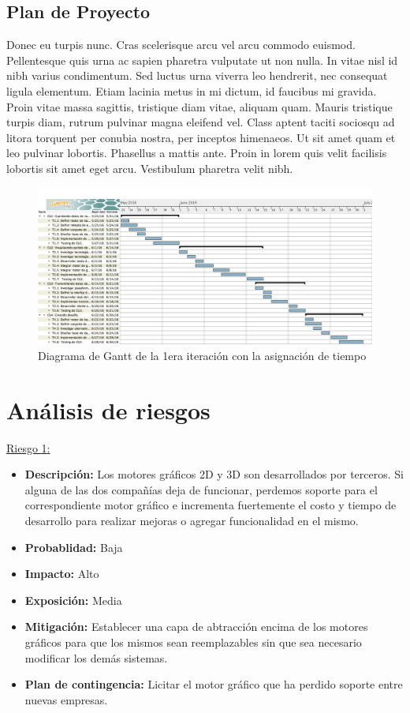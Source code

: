 \documentclass[a4paper, 10pt, twoside]{article}
\newcommand{\riesgo}[7]{
  \underline{Riesgo {#1}:}
  \begin{itemize}   
    \item \textbf{Descripción:} {#2}
    \item \textbf{Probablidad:} {#3}
    \item \textbf{Impacto:} {#4}
    \item \textbf{Exposición:} {#5}
    \item \textbf{Mitigación:} {#6}
    \item \textbf{Plan de contingencia:} {#7}
  \end{itemize}
}
\begin{document}
\subsection{Plan de Proyecto}
Donec eu turpis nunc. Cras scelerisque arcu vel arcu commodo euismod. Pellentesque quis urna ac sapien pharetra vulputate ut non nulla. In vitae nisl id nibh varius condimentum. Sed luctus urna viverra leo hendrerit, nec consequat ligula elementum. Etiam lacinia metus in mi dictum, id faucibus mi gravida. Proin vitae massa sagittis, tristique diam vitae, aliquam quam. Mauris tristique turpis diam, rutrum pulvinar magna eleifend vel. Class aptent taciti sociosqu ad litora torquent per conubia nostra, per inceptos himenaeos. Ut sit amet quam et leo pulvinar lobortis. Phasellus a mattis ante. Proin in lorem quis velit facilisis lobortis sit amet eget arcu. Vestibulum pharetra velit nibh.

\begin{landscape}
\begin{center}
  \begin{figure}[h!]
    \includegraphics[width=25cm]{gantt.png}
    \caption{Diagrama de Gantt de la 1era iteración con la asignación de tiempo}
    \label{fig:gantt}
  \end{figure}
\end{center}
\end{landscape}
\newpage


\section{Análisis de riesgos}
\label{riesgos:r1}
\riesgo{1}
    { Los motores gráficos 2D y 3D son desarrollados por terceros. Si alguna de las dos compañías deja de funcionar, perdemos soporte para el correspondiente motor gráfico e incrementa fuertemente el costo y tiempo de desarrollo para realizar mejoras o agregar funcionalidad en el mismo. }
    {Baja} %
    {Alto} %
    {Media} %
    {Establecer una capa de abtracción encima de los motores gráficos para que los mismos sean reemplazables sin que sea necesario modificar los demás sistemas.} %
    {Licitar el motor gráfico que ha perdido soporte entre nuevas empresas.} %
\end{document}
